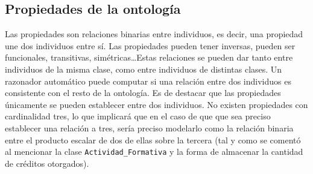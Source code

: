 	\subsection{Propiedades de la ontología}
	Las propiedades son relaciones binarias entre individuos, es decir, una propiedad une dos individuos entre sí. Las propiedades pueden tener inversas, pueden ser funcionales, transitivas, simétricas\ldots  Estas relaciones se pueden dar tanto entre individuos de la misma clase, como entre individuos de distintas clases.
	Un razonador automático puede computar si una relación entre dos individuos es consistente con el resto de la ontología. 
	Es de destacar que las propiedades únicamente se pueden establecer entre dos individuos. No existen propiedades con cardinalidad tres, lo que implicará que en el caso de que que sea preciso establecer una relación a tres, sería preciso modelarlo como la relación binaria entre el producto escalar de dos de ellas sobre la tercera (tal y como se comentó al mencionar la clase \lstinline!Actividad_Formativa! y la forma de almacenar la cantidad de créditos otorgados).
  

